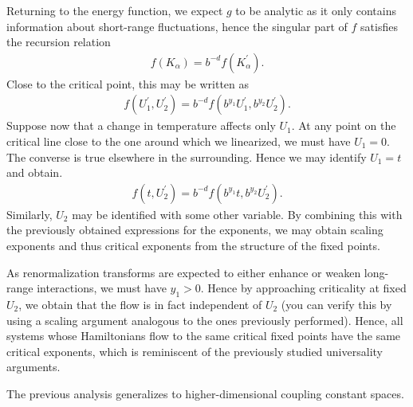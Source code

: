 Returning to the energy function, we expect $g$ to be analytic as it only contains information about short-range fluctuations, hence the singular part of $f$ satisfies the recursion relation
\begin{align*}
	f\left(K_{\alpha}\right) = b^{-d}f\left(K_{\alpha}^{\prime}\right).
\end{align*}
Close to the critical point, this may be written as
\begin{align*}
	f(U_{1}^{\prime}, U_{2}^{\prime}) = b^{-d}f\left(b^{y_{1}}U_{1}^{\prime}, b^{y_{2}}U_{2}^{\prime}\right).
\end{align*}
Suppose now that a change in temperature affects only $U_{1}$. At any point on the critical line close to the one around which we linearized, we must have $U_{1} = 0$. The converse is true elsewhere in the surrounding. Hence we may identify $U_{1} = t$ and obtain.
\begin{align*}
	f(t, U_{2}^{\prime}) = b^{-d}f\left(b^{y_{1}}t, b^{y_{2}}U_{2}^{\prime}\right).
\end{align*}
Similarly, $U_{2}$ may be identified with some other variable. By combining this with the previously obtained expressions for the exponents, we may obtain scaling exponents and thus critical exponents from the structure of the fixed points.

As renormalization transforms are expected to either enhance or weaken long-range interactions, we must have $y_{1} > 0$. Hence by approaching criticality at fixed $U_{2}$, we obtain that the flow is in fact independent of $U_{2}$ (you can verify this by using a scaling argument analogous to the ones previously performed). Hence, all systems whose Hamiltonians flow to the same critical fixed points have the same critical exponents, which is reminiscent of the previously studied universality arguments.

The previous analysis generalizes to higher-dimensional coupling constant spaces.

